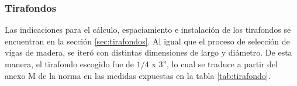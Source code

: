 \subsubsection{Tirafondos}
Las indicaciones para el cálculo, espaciamiento e instalación de los tirafondos se encuentran en la sección \ref{sec:tirafondos}. Al igual que el proceso de selección de vigas de madera, se iteró con distintas dimensiones de largo y diámetro. De esta manera, el tirafondo escogido fue de $1/4$ x 3'', lo cual se traduce a partir del anexo M de la norma en las medidas expuestas en la tabla \ref{tab:tirafondo}.
\begin{table}[h]
\centering
{}
\caption{Dimensiones del tirafondo utilizado}
\label{tab:tirafondo}
\end{table}

